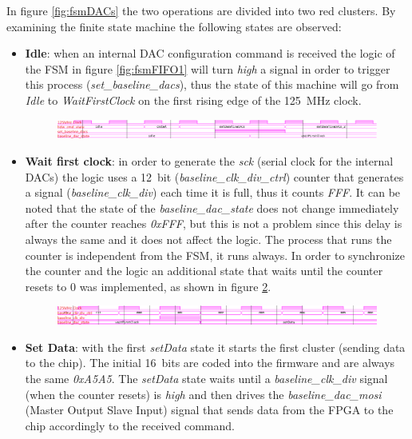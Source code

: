 In figure \ref{fig:fsmDACs} the two operations are divided into two red clusters.
By examining the finite state machine the following states are observed:
\begin{itemize}
	\item \textbf{Idle}: when an internal DAC configuration command is received the logic of the FSM in figure \ref{fig:fsmFIFO1} will turn \textit{high} a signal in order to trigger this process (\textit{set\_baseline\_dacs}), thus the state of this machine will go from \textit{Idle} to \textit{WaitFirstClock} on the first rising edge of the 125~MHz clock.
	\begin{figure}[H]
		\centering
		\includegraphics[width=1.0\linewidth]{IMG/ch4/DACsimulations/FSMiddle}
		\caption{}
		\label{fig:fsmiddle}
	\end{figure} 
	\item \textbf{Wait first clock}: in order to generate the \textit{sck} (serial clock for the internal DACs) the logic uses a 12~bit (\textit{baseline\_clk\_div\_ctrl}) counter that generates a signal (\textit{baseline\_clk\_div}) each time it is full, thus it counts \textit{FFF}.
	\newline It can be noted that the state of the \textit{baseline\_dac\_state} does not change immediately after the counter reaches \textit{0xFFF}, but this is not a problem since this delay is always the same and it does not affect the logic.
	\newline The process that runs the counter is independent from the FSM, it runs always. In order to synchronize the counter and the logic an additional state that waits until the counter resets to 0 was implemented, as shown in figure \ref{fig:fsmwaitfirstclock}. 
	\begin{figure}[H]
		\centering
		\includegraphics[width=1.0\linewidth]{IMG/ch4/DACsimulations/FSMwaitfirstclock}
		\caption{}
		\label{fig:fsmwaitfirstclock}
	\end{figure}
	\item \textbf{Set Data}: with the first \textit{setData} state it starts the first cluster (sending data to the chip).
	The initial 16~bits are coded into the firmware and are always the same \textit{0xA5A5}.
	The \textit{setData} state waits until a \textit{baseline\_clk\_div} signal (when the counter resets) is \textit{high} and then drives the \textit{baseline\_dac\_mosi} (Master Output Slave Input) signal that sends data from the FPGA to the chip accordingly to the received command.

\end{itemize}
